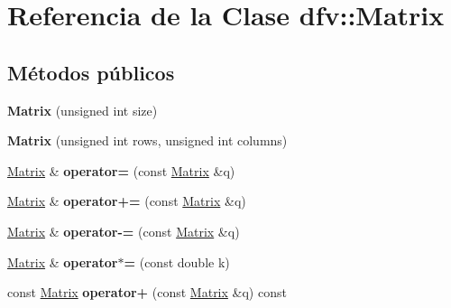 \hypertarget{classdfv_1_1Matrix}{\section{\-Referencia de la \-Clase dfv\-:\-:\-Matrix}
\label{classdfv_1_1Matrix}
}
\subsection*{\-Métodos públicos}
\begin{DoxyCompactItemize}
\item 
\hypertarget{classdfv_1_1Matrix_a33930d4646e2e4fbe22f0ae360befeb4}{{\bfseries \-Matrix} (unsigned int size)}\label{classdfv_1_1Matrix_a33930d4646e2e4fbe22f0ae360befeb4}

\item 
\hypertarget{classdfv_1_1Matrix_aa929489291d7f10011aa15de8049ca5e}{{\bfseries \-Matrix} (unsigned int rows, unsigned int columns)}\label{classdfv_1_1Matrix_aa929489291d7f10011aa15de8049ca5e}

\item 
\hypertarget{classdfv_1_1Matrix_a469e6974084786e6a67e99e995d02b35}{\hyperlink{classdfv_1_1Matrix}{\-Matrix} \& {\bfseries operator=} (const \hyperlink{classdfv_1_1Matrix}{\-Matrix} \&q)}\label{classdfv_1_1Matrix_a469e6974084786e6a67e99e995d02b35}

\item 
\hypertarget{classdfv_1_1Matrix_a1dc2f6bd2f8123d60bc4682717c13050}{\hyperlink{classdfv_1_1Matrix}{\-Matrix} \& {\bfseries operator+=} (const \hyperlink{classdfv_1_1Matrix}{\-Matrix} \&q)}\label{classdfv_1_1Matrix_a1dc2f6bd2f8123d60bc4682717c13050}

\item 
\hypertarget{classdfv_1_1Matrix_a4830b9e6a392cfbb8add97b7af58c4a3}{\hyperlink{classdfv_1_1Matrix}{\-Matrix} \& {\bfseries operator-\/=} (const \hyperlink{classdfv_1_1Matrix}{\-Matrix} \&q)}\label{classdfv_1_1Matrix_a4830b9e6a392cfbb8add97b7af58c4a3}

\item 
\hypertarget{classdfv_1_1Matrix_afa9657c65f887fe13119de7ad15ab9de}{\hyperlink{classdfv_1_1Matrix}{\-Matrix} \& {\bfseries operator$\ast$=} (const double k)}\label{classdfv_1_1Matrix_afa9657c65f887fe13119de7ad15ab9de}

\item 
\hypertarget{classdfv_1_1Matrix_ae148d04cc81b2b5f818a09532eaec2f6}{const \hyperlink{classdfv_1_1Matrix}{\-Matrix} {\bfseries operator+} (const \hyperlink{classdfv_1_1Matrix}{\-Matrix} \&q) const }\label{classdfv_1_1Matrix_ae148d04cc81b2b5f818a09532eaec2f6}


\end{DoxyCompactItemize}
